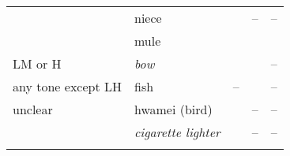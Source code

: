\begin{subtables}
\begin{table}[p!]
\begin{tabularx}{\textwidth}{ P{22mm} P{26mm} P{20mm} Q Q }
			& 	niece &  & -- & --\\
			& 	mule &  &  & \\ \addlinespace \hdashline \addlinespace
			LM or H & 	\textit{bow} &  &  & --\\ \addlinespace \hdashline \addlinespace
			any tone except LH & 	fish & -- &  & --\\ \addlinespace \hdashline \addlinespace
			unclear & 	hwamei (bird) &  & -- & --\\
			& 	\textit{cigarette lighter} &  & -- & --\\
			\lspbottomrule
		\end{tabularx}
	\end{table}
\end{subtables}


